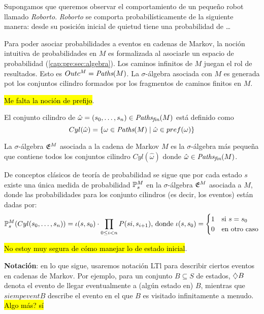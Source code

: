 \begin{example}
	Supongamos que queremos observar el comportamiento de un pequeño robot llamado \textit{Roborto}. \textit{Roborto} se comporta probabilísticamente de la siguiente manera: desde su posición inicial de quietud tiene una probabilidad de \dots
\end{example}

Para poder asociar probabilidades a eventos en cadenas de Markov, la noción
intuitiva de probabilidades en $M$ es formalizada al asociarle un espacio de
probabilidad (\ref{cap:pre:sec:algebra}). Los caminos infinitos de $M$ juegan
el rol de resultados. Esto es $Outc^M = \textit{Paths}(M)$. La $\sigma$-álgebra
asociada con $M$ es generada pot los conjuntos cilindro formados por los
fragmentos de caminos finitos en $M$.

\hl{Me falta la noción de prefijo}.

\begin{definition}
	El conjunto cilindro de $\hat \omega = (s_0, \dots, s_n) \in \textit{Paths}_\textit{fin}(M)$ está definido como
	$$Cyl(\hat \omega) = \{\omega \in \textit{Paths}(M) \mid \hat \omega \in pref(\omega)\}$$
\end{definition}

\begin{definition}
	La $\sigma$-álgebra $\mathfrak{E}^M$ asociada a la cadena de Markov $M$ es la $\sigma$-álgebra más pequeña que contiene todos los conjuntos cilindro $Cyl(\hat \omega)$ donde $\hat \omega \in \textit{Paths}_\textit{fin}(M)$.
\end{definition}

De conceptos clásicos de teoría de probabilidad se sigue que por cada estado
$s$ existe una única medida de probabilidad $\mathbb{P}^M_{s}$ en la
$\sigma$-álgebra $\mathfrak{E}^M$ asociada a $M$, donde las probabilidades para los
conjunto cilindros (es decir, los eventos) están dadas por:
\begin{equation}
	\label{probMC}
	\mathbb{P}^M_{s}(Cyl(s_0, \dots, s_n)) = \iota(s,s_0) \cdot \prod_{0 \leq i < n} P(si, s_{i+1})\text{, donde }\iota(s,s_0) =
	\begin{cases}
		1 &\text{si } s = s_0 \\
		0 &\text{en otro caso}
	\end{cases}
\end{equation}

\hl{No estoy muy segura de cómo manejar lo de estado inicial}.

\textbf{Notación}: en lo que sigue, usaremos notación LTl para describir ciertos eventos en cadenas de Markov. Por ejemplo, para un conjunto $B \subseteq S$ de estados, $\diamondsuit B$ denota el evento de llegar eventualmente a (algún estado en) $B$, mientras que $siempevent B$ describe el evento en el que $B$ es visitado infinitamente a menudo. \hl{Algo más? sí}

